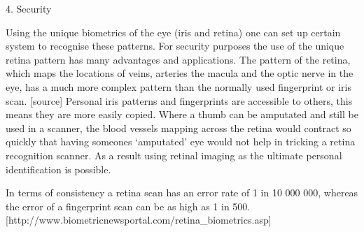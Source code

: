 4. Security

Using the unique biometrics of the eye (iris and retina) one can set up certain system to recognise these patterns. For security purposes the use of the unique retina pattern has many advantages and applications. The pattern of the retina, which maps the locations of veins, arteries the macula and the optic nerve in the eye, has a much more complex pattern than the normally used fingerprint or iris scan. [source] Personal iris patterns and fingerprints are accessible to others, this means they are more easily copied. Where a thumb can be amputated and still be used in a scanner, the blood vessels mapping across the retina would contract so quickly that having someones ‘amputated’ eye would not help in tricking a retina recognition scanner. As a result using retinal imaging as the ultimate personal identification is possible. 

In terms of consistency a retina scan has an error rate of 1 in 10 000 000, whereas the error of a fingerprint scan can be as high as 1 in 500. [http://www.biometricnewsportal.com/retina_biometrics.asp]